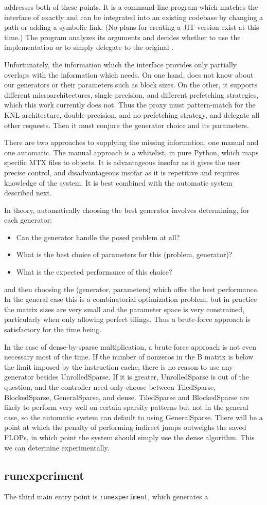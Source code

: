  addresses both of these points. It is a command-line program which matches the interface of  exactly and can be integrated into an existing codebase by changing a path or adding a symbolic link. (No plans for creating a JIT version exist at this time.) The program analyzes its arguments and decides whether to use the  implementation or to simply delegate to the original .

Unfortunately, the information which the  interface provides only partially overlaps with the information which  needs. On one hand,  does not know about our generators or their parameters such as block sizes. On the other, it supports different microarchitectures, single precision, and different prefetching strategies, which this work currently does not. Thus the proxy must pattern-match for the KNL architecture, double precision, and no prefetching strategy, and delegate all other requests. Then it must conjure the generator choice and its parameters.

There are two approaches to supplying the missing information, one manual and one automatic. The manual approach is a whitelist, in pure Python, which maps specific MTX files to  objects. It is advantageous insofar as it gives the user precise control, and disadvantageous insofar as it is repetitive and requires knowledge of the system. It is best combined with the automatic system described next.

In theory, automatically choosing the best generator involves determining, for each generator:
\begin{itemize}
  \item{Can the generator handle the posed problem at all?}
  \item{What is the best choice of parameters for this (problem, generator)?}
  \item{What is the expected performance of this choice?}
\end{itemize}
and then choosing the (generator, parameters) which offer the best performance. In the general case this is a combinatorial optimization problem, but in practice the matrix sizes are very small and the parameter space is very constrained, particularly when only allowing perfect tilings. Thus a brute-force approach is satisfactory for the time being. 

In the case of dense-by-sparse multiplication, a brute-force approach is not even necessary most of the time. If the number of nonzeros in the B matrix is below the limit imposed by the instruction cache, there is no reason to use any generator besides UnrolledSparse. If it is greater, UnrolledSparse is out of the question, and the controller need only choose between TiledSparse, BlockedSparse, GeneralSparse, and dense. TiledSparse and BlockedSparse are likely to perform very well on certain sparsity patterns but not in the general case, so the automatic system can default to using GeneralSparse. There will be a point at which the penalty of performing indirect jumps outweighs the saved FLOPs, in which point the system should simply use the dense algorithm. This we can determine experimentally.


\subsection{runexperiment}
The third main entry point is \texttt{runexperiment}, which generates a 


